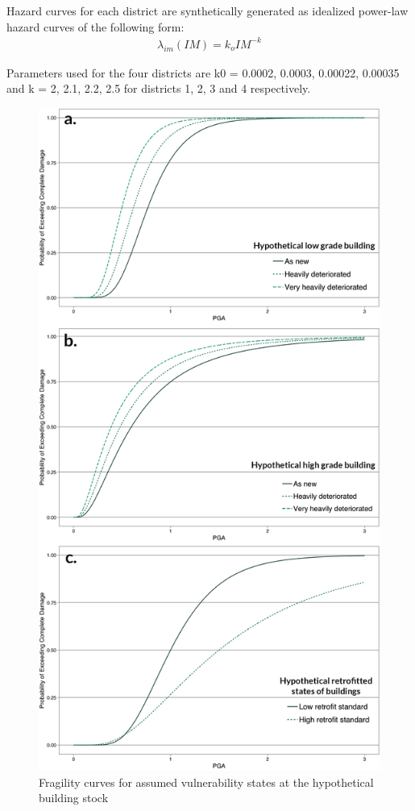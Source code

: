 Hazard curves for each district are synthetically generated as idealized power-law hazard curves of the following form:
\begin{equation}
\begin{split}
    \lambda_{im} (IM) = k_{o}IM^{-k}
\end{split}
\label{eq:rao2}
\end{equation}

Parameters used for the four districts are k0 = 0.0002, 0.0003, 0.00022, 0.00035 and k = 2, 2.1, 2.2, 2.5
for districts 1, 2, 3 and 4 respectively.


\begin{figure}[htbp!]
 \centering
  \includegraphics[width=.7\linewidth]{Figures/fragcurves5.jpg}
  \caption{Fragility curves for assumed vulnerability states at the hypothetical building stock}
  \label{fig:fragcurves}
\end{figure} 

